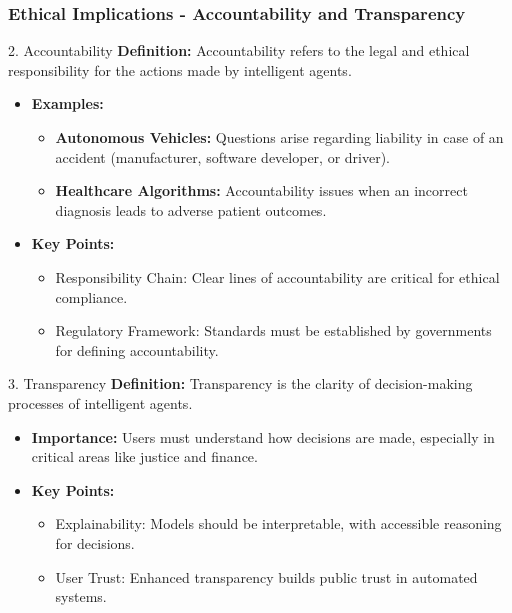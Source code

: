\documentclass[aspectratio=169]{beamer}
\begin{document}
\begin{frame}[fragile]
    \frametitle{Ethical Implications - Accountability and Transparency}
    \begin{block}{2. Accountability}
        \textbf{Definition:} Accountability refers to the legal and ethical responsibility for the actions made by intelligent agents.
        \begin{itemize}
            \item \textbf{Examples:}
            \begin{itemize}
                \item \textbf{Autonomous Vehicles:} Questions arise regarding liability in case of an accident (manufacturer, software developer, or driver).
                \item \textbf{Healthcare Algorithms:} Accountability issues when an incorrect diagnosis leads to adverse patient outcomes.
            \end{itemize}
            \item \textbf{Key Points:}
            \begin{itemize}
                \item Responsibility Chain: Clear lines of accountability are critical for ethical compliance.
                \item Regulatory Framework: Standards must be established by governments for defining accountability.
            \end{itemize}
        \end{itemize}
    \end{block}

    \begin{block}{3. Transparency}
        \textbf{Definition:} Transparency is the clarity of decision-making processes of intelligent agents.
        \begin{itemize}
            \item \textbf{Importance:} Users must understand how decisions are made, especially in critical areas like justice and finance.
            \item \textbf{Key Points:}
            \begin{itemize}
                \item Explainability: Models should be interpretable, with accessible reasoning for decisions.
                \item User Trust: Enhanced transparency builds public trust in automated systems.
            \end{itemize}
        \end{itemize}
    \end{block}
\end{frame}
\end{document}
